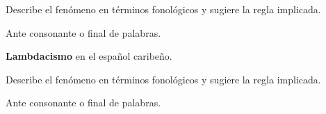 \documentclass[12pt]{article}
\begin{document}
 
 Describe el fenómeno en términos fonológicos y sugiere la regla implicada.
 
 Ante consonante o final de palabras.
 
 \pex
 \a {}
 \a  {}
 \a {}
\xe
 
	



\textbf{Lambdacismo} en el español caribeño. 

\ex {}
\xe



 
 Describe el fenómeno en términos fonológicos y sugiere la regla implicada.
 
 Ante consonante o final de palabras.
 
 \pex
 \a {}
 \a  {}
 \a {}
\xe
 
\end{document}
